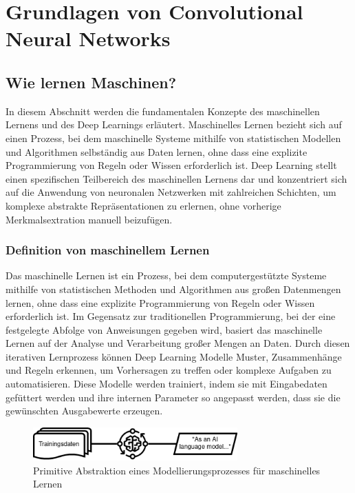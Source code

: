 \chapter{Grundlagen von Convolutional Neural Networks}

\section{Wie lernen Maschinen?}

    In diesem Abschnitt werden die fundamentalen Konzepte des maschinellen Lernens und des Deep Learnings erläutert. 
    Maschinelles Lernen bezieht sich auf einen Prozess, bei dem maschinelle Systeme mithilfe von statistischen Modellen und Algorithmen selbständig aus Daten lernen, ohne dass eine explizite Programmierung von Regeln oder Wissen erforderlich ist. 
    Deep Learning stellt einen spezifischen Teilbereich des maschinellen Lernens dar und konzentriert sich auf die Anwendung von neuronalen Netzwerken mit zahlreichen Schichten, um komplexe abstrakte Repräsentationen zu erlernen, ohne vorherige Merkmalsextration manuell beizufügen.
    
\subsection{Definition von maschinellem Lernen}
    
    Das maschinelle Lernen ist ein Prozess, bei dem computergestützte Systeme mithilfe von statistischen Methoden und Algorithmen aus großen Datenmengen lernen, ohne dass eine explizite Programmierung von Regeln oder Wissen erforderlich ist. 
    Im Gegensatz zur traditionellen Programmierung, bei der eine festgelegte Abfolge von Anweisungen gegeben wird, basiert das maschinelle Lernen auf der Analyse und Verarbeitung großer Mengen an Daten. 
    Durch diesen iterativen Lernprozess können Deep Learning Modelle Muster, Zusammenhänge und Regeln erkennen, um Vorhersagen zu treffen oder komplexe Aufgaben zu automatisieren.
    Diese Modelle werden trainiert, indem sie mit Eingabedaten gefüttert werden und ihre internen Parameter so angepasst werden, dass sie die gewünschten Ausgabewerte erzeugen. 

    \begin{figure}[h]
        \centering
        \vspace{8mm}
        \includegraphics[width=0.7\textwidth]{img/machinelearning_example.png}
        \caption{Primitive Abstraktion eines Modellierungsprozesses für maschinelles Lernen}
        \label{fig:primitive_Abstraktion_eines_Modellierungsprozesses_für_maschinelles_Lernen}
        \vspace{8mm}
    \end{figure}
    
